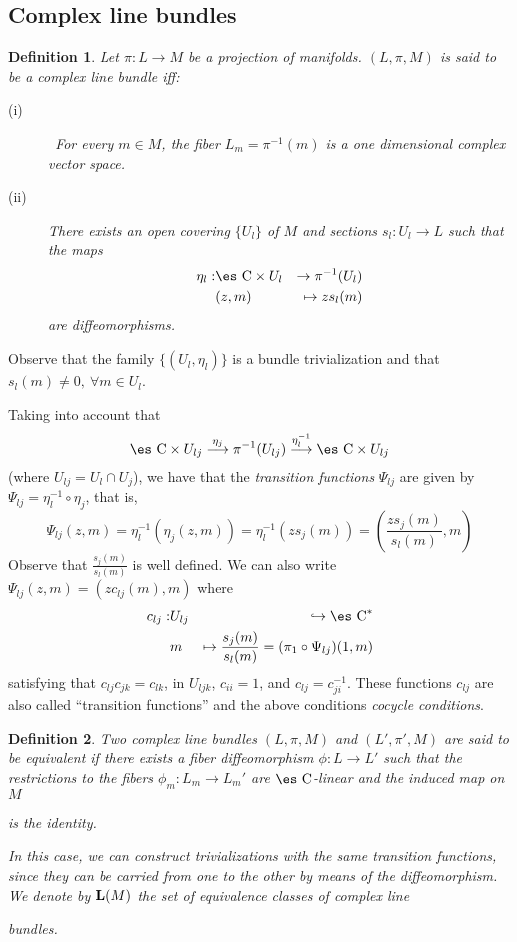 \documentclass[12pt]{article}
\newtheorem{definition}{Definition}
\def\beann{\begin{eqnarray*}}
\def\eeann{\end{eqnarray*}}
\def\mapping#1{\mathrel{\mathop{\longrightarrow}\limits^{#1}}}
\def\Complex{\mbox{\es C}}
\begin{document}
\subsection{Complex line bundles}


\begin{definition}
Let $\pi :L \to M$ be a projection of manifolds.
$(L,\pi ,M)$ is said to be a {\rm complex line bundle} iff:
\begin{description}
\item[{\rm (i)}] \
For every $m \in M$, the fiber $L_m = \pi^{-1}(m)$
is a one dimensional complex vector space.
\item[{\rm (ii)}]
There exists an open covering $\{ U_l \}$ of $M$
and sections $s_l:U_l \to L$ such that the maps
\beann
\eta_l : & \Complex \times U_l & \to  \pi^{-1}(U_l)
\\
& (z,m) & \mapsto zs_l(m)
\eeann
are diffeomorphisms.
\end{description}
\label{clb}
\end{definition}

Observe that the family $\{ (U_l,\eta_l) \}$
is a bundle trivialization and that $s_l(m) \not= 0, \ \forall m \in
U_l$.

Taking into account that
$$
\Complex \times U_{l j} \mapping{\eta_j}
\pi^{-1}(U_{l j}) \mapping{\eta_l^{-1}} \Complex \times U_{l j}
$$
(where $U_{l j}=U_l \cap U_j$), we have that the {\it transition
functions}
$\Psi_{l j}$ are given by $\Psi_{l j} = \eta_l^{-1} \circ \eta_j$, that
is,
$$
\Psi_{l j}(z,m) = \eta_l^{-1}(\eta_j(z,m)) =
\eta_l^{-1}(zs_j(m)) =
\left(\frac {zs_j(m)}{s_l(m)},m\right)
$$
Observe that $\frac{s_j(m)}{s_l(m)}$ is well defined.
We can also write $\Psi_{l j}(z,m) =(zc_{l j}(m),m)$ where
\beann
c_{l j} : & U_{l j} & \hookrightarrow \Complex^*
\\
& m & \mapsto \frac{s_j(m)}{s_l(m)} = (\pi_1 \circ \Psi_{l j})(1,m)
\eeann
satisfying that $c_{l j}c_{jk} = c_{l k}$, in $U_{l jk}$,
$c_{ii} = 1$, and $c_{l j} = c_{ji}^{-1}$.
These functions $c_{l j}$ are also called ``transition functions''
and the above conditions {\it cocycle conditions}.

\begin{definition}
Two complex line bundles $(L,\pi ,M)$ and $(L',\pi ',M)$
are said to be {\rm equivalent} if there exists a fiber diffeomorphism
$\phi : L \to L'$ such that the restrictions to the fibers
$\phi_m : L_m \to L_m'$ are $\Complex$-linear and the induced map on $M$

is the identity.

In this case, we can construct trivializations with the same
transition functions, since they can be carried from one to the other
by means of the diffeomorphism.
We denote by ${\bf L}(M)$ the set of equivalence classes of complex line

bundles.
\label{clbe}
\end{definition}
\end{document}
